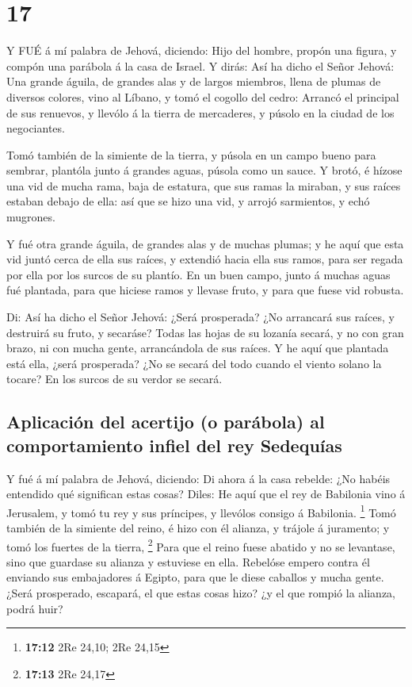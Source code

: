 \hypertarget{section-16}{%
\section{17}\label{section-16}}

 Y FUÉ á mí palabra de Jehová, diciendo:  Hijo
del hombre, propón una figura, y compón una parábola á la casa de
Israel.  Y dirás: Así ha dicho el Señor Jehová: Una grande
águila, de grandes alas y de largos miembros, llena de plumas de
diversos colores, vino al Líbano, y tomó el cogollo del cedro:
 Arrancó el principal de sus renuevos, y llevólo á la tierra
de mercaderes, y púsolo en la ciudad de los negociantes.

 Tomó también de la simiente de la tierra, y púsola en un
campo bueno para sembrar, plantóla junto á grandes aguas, púsola como un
sauce.  Y brotó, é hízose una vid de mucha rama, baja de
estatura, que sus ramas la miraban, y sus raíces estaban debajo de ella:
así que se hizo una vid, y arrojó sarmientos, y echó mugrones.

 Y fué otra grande águila, de grandes alas y de muchas
plumas; y he aquí que esta vid juntó cerca de ella sus raíces, y
extendió hacia ella sus ramos, para ser regada por ella por los surcos
de su plantío.  En un buen campo, junto á muchas aguas fué
plantada, para que hiciese ramos y llevase fruto, y para que fuese vid
robusta.

 Di: Así ha dicho el Señor Jehová: ¿Será prosperada? ¿No
arrancará sus raíces, y destruirá su fruto, y secaráse? Todas las hojas
de su lozanía secará, y no con gran brazo, ni con mucha gente,
arrancándola de sus raíces.  Y he aquí que plantada está
ella, ¿será prosperada? ¿No se secará del todo cuando el viento solano
la tocare? En los surcos de su verdor se secará.

\hypertarget{aplicaciuxf3n-del-acertijo-o-paruxe1bola-al-comportamiento-infiel-del-rey-sedequuxedas}{%
\subsection{Aplicación del acertijo (o parábola) al comportamiento
infiel del rey
Sedequías}\label{aplicaciuxf3n-del-acertijo-o-paruxe1bola-al-comportamiento-infiel-del-rey-sedequuxedas}}

 Y fué á mí palabra de Jehová, diciendo:  Di
ahora á la casa rebelde: ¿No habéis entendido qué significan estas
cosas? Diles: He aquí que el rey de Babilonia vino á Jerusalem, y tomó
tu rey y sus príncipes, y llevólos consigo á Babilonia. \footnote{\textbf{17:12}
  2Re 24,10; 2Re 24,15}  Tomó también de la simiente del
reino, é hizo con él alianza, y trájole á juramento; y tomó los fuertes
de la tierra, \footnote{\textbf{17:13} 2Re 24,17}  Para que
el reino fuese abatido y no se levantase, sino que guardase su alianza y
estuviese en ella.  Rebelóse empero contra él enviando sus
embajadores á Egipto, para que le diese caballos y mucha gente. ¿Será
prosperado, escapará, el que estas cosas hizo? ¿y el que rompió la
alianza, podrá huir?

